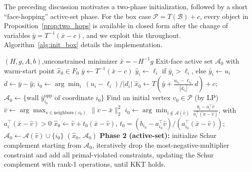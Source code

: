 \documentclass[pdflatex,sn-mathphys-num]{sn-jnl}%
\theoremstyle{thmstyleone}%
\theoremstyle{thmstyletwo}%
\theoremstyle{thmstylethree}%
\theoremstyle{thmstylethree}%
\begin{document}
The preceding discussion motivates a two-phase initialization, followed by a short \enquote{face-hopping} active-set phase.
For the box case $\mathcal{P}=T(\mathcal{B})+c$, every object in Proposition~\ref{prop:two_hops} is available in closed form after the change of variables $\bar{y}=T^{-1}(\bar{x}-c)$, and we exploit this throughout. Algorithm~\ref{alg:init_box} details the implementation.

\begin{algorithm}[H]
\caption{Geometry-Accelarated Active Set Solver}
\label{alg:init_box}
\begin{algorithmic}
\Require $(H,g,A,b)$,\quad unconstrained minimizer $\bar{x}=-H^{-1}g$
\Ensure Exit-face active set $\mathcal{A}_0$ with warm-start point $\hat{x}_0\in F_0$
\State
{} 
  \State $\bar{y} \gets T^{-1}(\bar{x}-c)$
   
    \State $\hat{y}_i \gets \ell_i$ if $\bar{y}_i > \ell_i$, else $\hat{y}_i \gets u_i$
  \EndFor
  \State $d \gets \bar{y}-\hat{y}$;\quad
         $i_0 \gets \arg\min_{i}\,(u_i-\ell_i)/|d_i|$ 
  \State $\hat{x}_0 \gets T\!\left(\hat{y} + \tfrac{u_{i_0}-\ell_{i_0}}{|d_{i_0}|}\,d\right)+c$;\quad
         $\mathcal{A}_0 \gets \{\text{wall } \hat{y}^{\mathrm{opp}}_{i_0}\text{ of coordinate }i_0\}$
\Else {}
  \State Find an initial vertex $v_0\in\mathcal{P}$ (by LP)
  \State $\hat{v} \gets \arg\max_{v\in\text{neighbors}(v_0)}\,\|v-\bar{x}\|_2^2$
  \State $i_0 \gets \arg\min_{i\notin\mathcal{A}(\hat{v})}\,
         \frac{b_i - a_i^\top\hat{v}}{a_i^\top(\bar{x}-\hat{v})}$,
         \quad with $a_i^\top(\bar{x}-\hat{v})>0$ 
  \State $\hat{x}_0 \gets \hat{v} + t_0(\bar{x}-\hat{v})$,\;
         $t_0=(b_{i_0}-a_{i_0}^\top\hat{v})/(a_{i_0}^\top(\bar{x}-\hat{v}))$;\quad
         $\mathcal{A}_0 \gets \mathcal{A}(\hat{v})\cup\{i_0\}$
\EndIf
\State \Return $(\hat{x}_0,\,\mathcal{A}_0)$
\State
\textbf{Phase 2 (active-set):} initialize Schur complement starting from $\mathcal{A}_0$,
iteratively drop the most-negative-multiplier constraint and add all primal-violated constraints,
updating the Schur complement with rank-1 operations, until KKT holds.
\end{algorithmic}
\end{algorithm}
\end{document}
